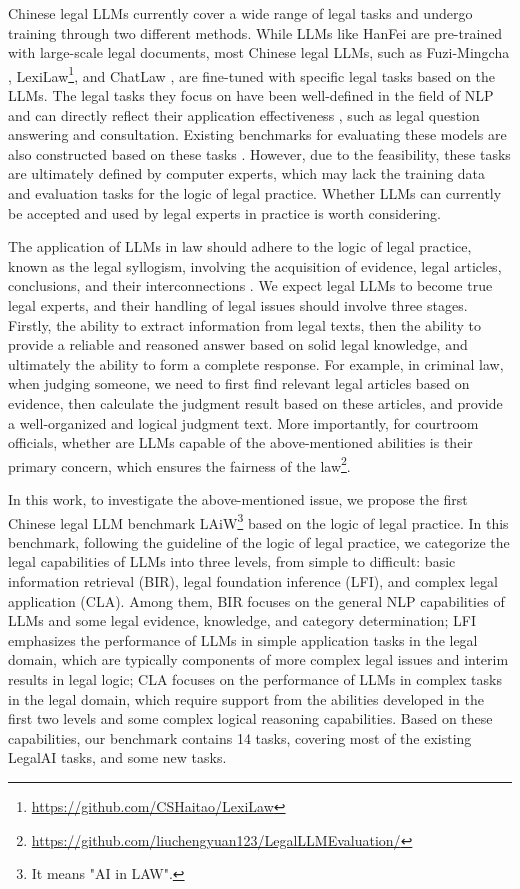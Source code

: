 Chinese legal LLMs currently cover a wide range of legal tasks and undergo training through two different methods. 
While LLMs like HanFei \cite{HanFei} are pre-trained with large-scale legal documents, most Chinese legal LLMs, such as Fuzi-Mingcha \cite{fuzi.mingcha}, LexiLaw\footnote{\url{https://github.com/CSHaitao/LexiLaw}}, and ChatLaw \cite{cui2023chatlaw}, are fine-tuned with specific legal tasks based on the LLMs. The legal tasks they focus on have been well-defined in the field of NLP and can directly reflect their application effectiveness \cite{zhong2020does, choi2023use, steenhuis2023weaving}, such as legal question answering and consultation. Existing benchmarks for evaluating these models are also constructed based on these tasks \cite{yue2023disclawllm,fei2023lawbench}. However, due to the feasibility, these tasks are ultimately defined by computer experts, which may lack the training data and evaluation tasks for the logic of legal practice. Whether LLMs can currently be accepted and used by legal experts in practice is worth considering.

The application of LLMs in law should adhere to the logic of legal practice, known as the legal syllogism, involving the acquisition of evidence, legal articles, conclusions, and their interconnections \cite{kuppa2023chain, trozze2023large}. We expect legal LLMs to become true legal experts, and their handling of legal issues should involve three stages. Firstly, the ability to extract information from legal texts, then the ability to provide a reliable and reasoned answer based on solid legal knowledge, and ultimately the ability to form a complete response. For example, in criminal law, when judging someone, we need to first find relevant legal articles based on evidence, then calculate the judgment result based on these articles, and provide a well-organized and logical judgment text. 
More importantly, for courtroom officials, whether are LLMs capable of the above-mentioned abilities is their primary concern, which ensures the fairness of the law\footnote{\url{https://github.com/liuchengyuan123/LegalLLMEvaluation/}}.

In this work, to investigate the above-mentioned issue, we propose the first Chinese legal LLM benchmark LAiW\footnote{It means "AI in LAW".} based on the logic of legal practice. In this benchmark, following the guideline of the logic of legal practice, we categorize the legal capabilities of LLMs into three levels, from simple to difficult: basic information retrieval (BIR), legal foundation inference (LFI), and complex legal application (CLA). Among them, BIR focuses on the general NLP capabilities of LLMs and some legal evidence, knowledge, and category determination; 
LFI emphasizes the performance of LLMs in simple application tasks in the legal domain, which are typically components of more complex legal issues and interim results in legal logic; 
CLA focuses on the performance of LLMs in complex tasks in the legal domain, which require support from the abilities developed in the first two levels and some complex logical reasoning capabilities.
Based on these capabilities, our benchmark contains 14 tasks, covering most of the existing LegalAI tasks, and some new tasks. 

